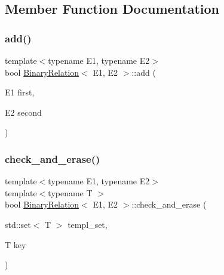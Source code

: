 \subsection{Member Function Documentation}
\mbox{\label{classBinaryRelation_a50e035f8c6a6ea0f3d410100200bf8ff}} 
\subsubsection{\texorpdfstring{add()}{add()}}
{\footnotesize\ttfamily template$<$typename E1, typename E2$>$ \\
bool \hyperlink{classBinaryRelation}{Binary\+Relation}$<$ E1, E2 $>$\+::add (\begin{DoxyParamCaption}\item[{E1}]{first,  }\item[{E2}]{second }\end{DoxyParamCaption})\hspace{0.3cm}{\ttfamily [inline]}}

\mbox{\label{classBinaryRelation_a96805510d13dac057a06d16a27196447}} 
\subsubsection{\texorpdfstring{check\+\_\+and\+\_\+erase()}{check\_and\_erase()}}
{\footnotesize\ttfamily template$<$typename E1, typename E2$>$ \\
template$<$typename T $>$ \\
bool \hyperlink{classBinaryRelation}{Binary\+Relation}$<$ E1, E2 $>$\+::check\+\_\+and\+\_\+erase (\begin{DoxyParamCaption}\item[{std\+::set$<$ T $>$}]{templ\+\_\+set,  }\item[{T}]{key }\end{DoxyParamCaption})\hspace{0.3cm}{\ttfamily [inline]}}

\mbox{\label{classBinaryRelation_a14bd1065b37bbf0793eb39dde25adf3b}} 

